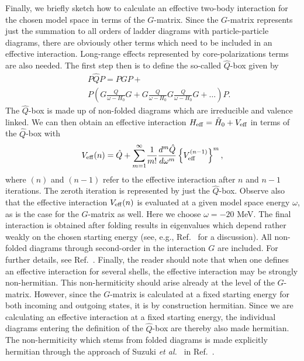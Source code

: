 \begin{multicols}{2}
Finally, we briefly sketch how to calculate an effective
two-body interaction for the chosen model space
in terms of the $G$-matrix.  Since the $G$-matrix represents just
the summation to all orders of ladder diagrams with particle-particle
diagrams, there are obviously other terms which need to be included
in an effective interaction. Long-range effects represented by
core-polarizations terms are also needed.
The first step then is to define the so-called $\hat{Q}$-box given by
\begin{eqnarray}
&&   P\hat{Q}P=PGP+   \label{eq:qbox}\\
&&   P\left(G\frac{Q}{\omega-H_{0}}G +G
   \frac{Q}{\omega-H_{0}}G \frac{Q}{\omega-H_{0}}G +\dots\right)P.
   \nonumber
\end{eqnarray}
The $\hat{Q}$-box is made up of non-folded diagrams which are irreducible
and valence linked.
We can then obtain an effective interaction
$H_{\rm eff}=\tilde{H}_0+V_{\rm eff}$ in
terms of the $\hat{Q}$-box
with \cite{hko95}
\begin{equation}
    V_{\rm eff}(n)=\hat{Q}+{\displaystyle\sum_{m=1}^{\infty}}
    \frac{1}{m!}\frac{d^m\hat{Q}}{d\omega^m}\left\{
    V_{\rm eff}^{(n-1)}\right\}^m,
    \label{eq:fd}
\end{equation}
where $(n)$ and $(n-1)$ refer to the effective interaction after $n$
and $n-1$ iterations. The zeroth iteration is represented by just the
$\hat{Q}$-box.  Observe also that the effective interaction $V_{\rm
  eff}(n)$ is evaluated at a given model space energy $\omega$, as is
the case for the $G$-matrix as well. Here we choose $\omega =-20$ MeV.
The final interaction is obtained after folding results in eigenvalues
which depend rather weakly on the chosen starting energy (see, e.g.,
Ref.\ \cite{converge93} for a discussion).  All non-folded diagrams
through second-order in the interaction $G$ are included.  For further
details, see Ref.\ \cite{hko95}.  Finally, the reader should note that
when one defines an effective interaction for several shells, the
effective interaction may be strongly non-hermitian.  This
non-hermiticity should arise already at the level of the $G$-matrix.
However, since the $G$-matrix is calculated at a fixed starting energy
for both incoming and outgoing states, it is by construction
hermitian. Since we are calculating an effective interaction at a
fixed starting energy, the individual diagrams entering the definition
of the $\hat{Q}$-box are thereby also made hermitian. The
non-hermiticity which stems from folded diagrams is made explicitly
hermitian through the approach of Suzuki {\em et al.\ } in Ref.\
\cite{kenji}.


\end{multicols}

